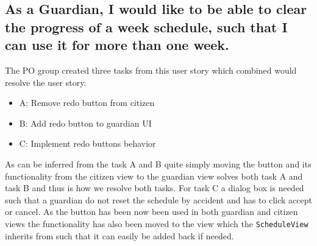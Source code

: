 \subsection{As a Guardian, I would like to be able to clear the progress of a week schedule, such that I can use it for more than one week.}
The PO group created three tasks from this user story which combined would resolve the user story.
\begin{itemize}
    \item A: Remove redo button from citizen
    \item B: Add redo button to guardian UI
    \item C: Implement redo buttons behavior
\end{itemize}
As can be inferred from the task A and B quite simply moving the button and its functionality from the citizen view to the guardian view solves both task A and task B and thus is how we resolve both tasks.
For task C a dialog box is needed such that a guardian do not reset the schedule by accident and has to click accept or cancel.
As the button has been now been used in both guardian and citizen views the functionality has also been moved to the view which the \texttt{ScheduleView} inherits from such that it can easily be added back if needed. 
